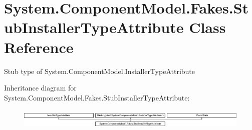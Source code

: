\hypertarget{class_system_1_1_component_model_1_1_fakes_1_1_stub_installer_type_attribute}{\section{System.\-Component\-Model.\-Fakes.\-Stub\-Installer\-Type\-Attribute Class Reference}
\label{class_system_1_1_component_model_1_1_fakes_1_1_stub_installer_type_attribute}
}


Stub type of System.\-Component\-Model.\-Installer\-Type\-Attribute 


Inheritance diagram for System.\-Component\-Model.\-Fakes.\-Stub\-Installer\-Type\-Attribute\-:\begin{figure}[H]
\begin{center}
\leavevmode
\includegraphics[height=0.995556cm]{class_system_1_1_component_model_1_1_fakes_1_1_stub_installer_type_attribute}
\end{center}
\end{figure}
